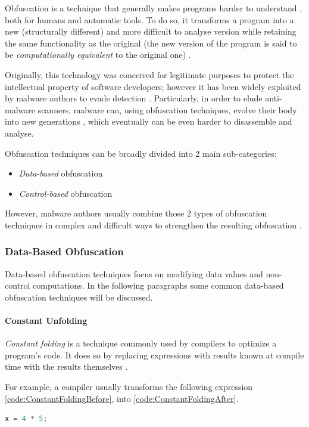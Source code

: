 \documentclass[pdfa%
,cucitura%
]{toptesi}
\begin{document}
Obfuscation is a technique that generally makes programs harder to understand \cite{Balakrishnan2005CodeOL}, both for humans and automatic tools. To do so, it transforms a program into a new (structurally different) and more difficult to analyse version while retaining the same functionality as the original (the new version of the program is said to be \textit{computationally equivalent} to the original one) \cite{YouMOT}.

Originally, this technology was conceived for legitimate purposes to protect the intellectual property of software developers; however it has been widely exploited by malware authors to evade detection \cite{KonstantinouMV}. Particularly, in order to elude anti-malware scanners, malware can, using obfuscation techniques, evolve their body into new generations \cite{YouMalwareOT}, which eventually can be even harder to disassemble and analyse.

Obfuscation techniques can be broadly divided into 2 main sub-categories:
\begin{itemize}
	\item \textit{Data-based} obfuscation
	\item \textit{Control-based} obfuscation
\end{itemize}

However, malware authors usually combine those 2 types of obfuscation techniques in complex and difficult ways to strengthen the resulting obfuscation \cite{DangPRE}.

\subsubsection{Data-Based Obfuscation}
Data-based obfuscation techniques focus on modifying data values and non-control computations. In the following paragraphs some common data-based obfuscation techniques will be discussed.

\paragraph{Constant Unfolding}
\textit{Constant folding} is a technique commonly used by compilers to optimize a program's code. It does so by replacing expressions with results known at compile time with the results themselves \cite{DangPRE}.

For example, a compiler usually transforms the following expression \ref{code:ConstantFoldingBefore}, into \ref{code:ConstantFoldingAfter}.
\begin{lstlisting}[caption={Before constant folding}, label=code:ConstantFoldingBefore, language=C, style=mystyle]
	x = 4 * 5;
\end{lstlisting}
\end{document}
